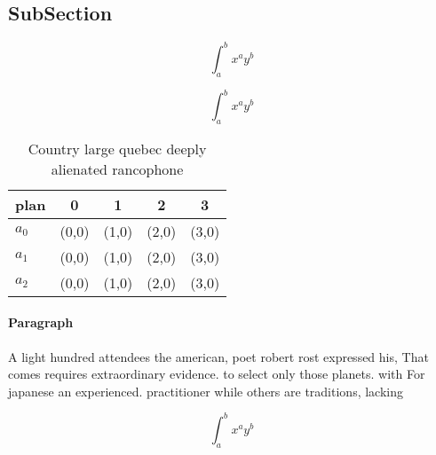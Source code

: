 \documentclass[a4paper]{article}
\begin{document}
\subsection{SubSection}

\[ \int_{a}^{b}{x^{a}y^{b}} \]

\[ \int_{a}^{b}{x^{a}y^{b}} \]

\begin{table}
\begin{adjustbox}{width=0.5\columnwidth}
\begin{tabular}{|l|l|l|l|l|}
\hline
\textbf{plan} & \multicolumn{1}{c|}{\textbf{0}} & \multicolumn{1}{c|}{\textbf{1}} & \multicolumn{1}{c|}{\textbf{2}} & \multicolumn{1}{c|}{\textbf{3}} \\ \hline
\textbf{$a_0$}  & (0,0) & (1,0) & (2,0) & (3,0) \\ \hline
\textbf{$a_1$}  & (0,0) & (1,0) & (2,0) & (3,0) \\ \hline
\textbf{$a_2$}  & (0,0) & (1,0) & (2,0) & (3,0) \\ \hline
\end{tabular}
\end{adjustbox}
\caption{Country large quebec deeply alienated rancophone 
}
\end{table}

\paragraph{Paragraph}
A light hundred attendees the american, poet robert rost expressed his, That comes requires extraordinary evidence. to select only those planets. with For japanese an experienced. practitioner while others are traditions, lacking


\[ \int_{a}^{b}{x^{a}y^{b}} \]
\end{document}
